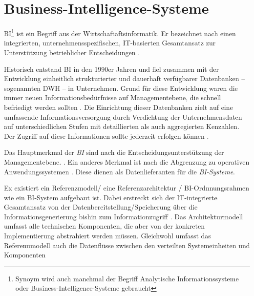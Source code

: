 \section{Business-Intelligence-Systeme}
\acrfull{BI}\footnote{Synoym wird auch manchmal der Begriff Analytische Informationssysteme oder Business-Intelligence-Systeme gebraucht}
ist ein Begriff aus der Wirtschaftaftsinformatik. 
Er bezeichnet nach \citeauthor{abts_grundkurs_2017} einen integrierten, unternehmensspezifischen,
IT-basierten Gesamtansatz zur Unterstützung betrieblicher Entscheidungen \cite[vgl.][270]{abts_grundkurs_2017}. 

Historisch entstand \acrshort{BI} in den 1990er Jahren und fiel zusammen mit der 
Entwicklung einheitlich strukturierter und dauerhaft verfügbarer Datenbanken -- sogenannten \acrfull{DWH} -- in Unternehmen.
Grund für diese Entwicklung waren die immer neuen Informationsbedürfnisse auf Managementebene, 
die schnell befriedigt werden sollten \cite[vgl.][268 f.]{abts_grundkurs_2017}.
Die Einrichtung dieser Datenbanken zielt auf eine umfassende Informationsversorgung durch 
Verdichtung der Unternehmensdaten auf unterschiedlichen Stufen mit detaillierten als auch aggregierten Kenzahlen.
Der Zugriff auf diese Informationen sollte jederzeit erfolgen können \cite[vgl.][267]{abts_grundkurs_2017}. 


Das Hauptmerkmal der \textit{\acrshort{BI}} sind nach  die Entscheidungsunterstützung der Managementebene.
\cite[vgl.][111]{linden_geschaftsmodellbasierte_2016}. Ein anderes Merkmal ist nach \citeauthor{abts_grundkurs_2017} die Abgrenzung zu operativen
Anwendungssystemen \cite[vgl.][267]{abts_grundkurs_2017}. Diese dienen als Datenlieferanten für die \textit{\acrshort{BI}-Systeme}.
 
Ex existiert ein Referenzmodell/ eine Referenzarchitektur / BI-Ordnnungsrahmen wie ein \acrshort{BI}-System aufgebaut ist.
Dabei erstreckt sich der IT-integrierte Gesamtansatz von der Datenbereitstellung/Speicherung über die Informationsgenerierung bishin zum Informationzugriff
\cite[vgl.][8]{kemper_business_2010}.
Das Architekturmodell umfasst alle technischen Komponenten, die aber von der konkreten Implementierung abstrahiert werden müssen.
Gleichwohl umfasst das Referenumodell auch die Datenflüsse zwischen den verteilten Systemeinheiten und Komponenten \cite[vgl.][126 ff.]{linden_geschaftsmodellbasierte_2016}

